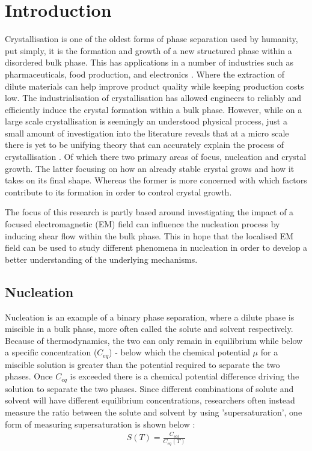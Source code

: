 \chapter{Introduction}
Crystallisation is one of the oldest forms of phase separation used by humanity\cite{Schoen1956}, put simply, it is the formation and growth 
of a new structured phase within a disordered bulk phase. This has 
applications in a number of industries such as pharmaceuticals, food 
production, and electronics \cite{Myerson2002}. Where the extraction 
of dilute materials can help improve product quality while keeping 
production costs low. The industrialisation of crystallisation has 
allowed engineers to reliably and efficiently induce the crystal 
formation within a bulk phase. However, while on a large scale 
crystallisation is seemingly an understood physical process, just a 
small amount of investigation into the literature reveals that at a 
micro scale there is yet to be unifying theory that can accurately 
explain the process of crystallisation \cite{Fu2021}. Of which there 
two primary areas of focus, nucleation and crystal growth. The latter 
focusing on how an already stable crystal grows and how it takes on its 
final shape. Whereas the former is more concerned with which factors 
contribute to its formation in order to control crystal growth.

The focus of this research is partly based around investigating the impact 
of a focused electromagnetic (EM) field can influence the nucleation process 
by inducing shear flow within the bulk phase. This in hope that the 
localised EM field can be used to study different phenomena in nucleation 
in order to develop a better understanding of the underlying mechanisms.

\section{Nucleation}
Nucleation is an example of a binary phase separation, where a dilute phase 
is miscible in a bulk phase, more often called the solute and solvent 
respectively. Because of thermodynamics, the two can only remain in 
equilibrium while below a specific concentration ($C_{eq}$) - below which 
the chemical potential $\mu$ for a miscible solution is greater than the 
potential required to separate the two phases. Once $C_{eq}$ is exceeded 
there is a chemical potential difference driving the solution to separate 
the two phases. Since different combinations of solute and solvent will 
have different equilibrium concentrations, researchers often instead measure 
the ratio between the solute and solvent by using 'supersaturation', one 
form of measuring supersaturation is shown below \cite{Mullin2001}:
\begin{align}
	\label{eq:supersaturation}
	S(T) = \frac{C_{sol}}{C_{eq}(T)}
\end{align}

